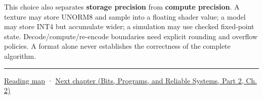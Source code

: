 This choice also separates \textbf{storage precision} from \textbf{compute precision}. A texture may store UNORM8 and sample into a floating shader value; a model may store INT4 but accumulate wider; a simulation may use checked fixed-point state. Decode/compute/re-encode boundaries need explicit rounding and overflow policies. A format alone never establishes the correctness of the complete algorithm.

\begin{center}\rule{0.5\linewidth}{0.5pt}\end{center}

\hyperref[volume-reading-map]{Reading map} · \href{../01-Bits-Programs-and-Reliable-Systems-P02/main.pdf\#nameddest=01-foundations-i-ch002-values-at-addresses-layout-lifetimes-and-representation}{Next chapter (Bits, Programs, and Reliable Systems, Part 2, Ch. 2)}
